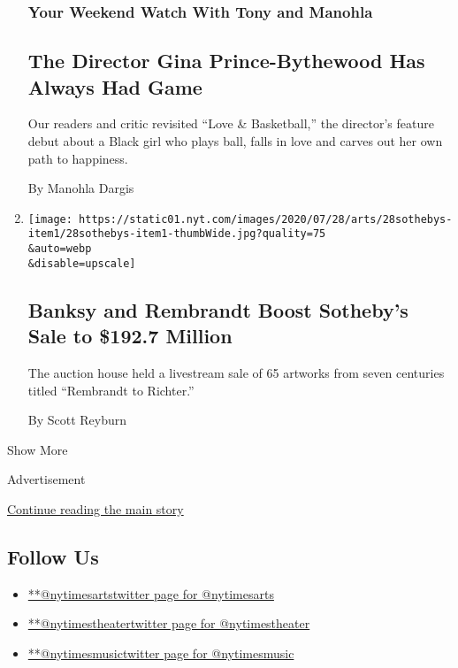 \begin{enumerate}
  \hypertarget{your-weekend-watch-with-tony-and-manohla}{%
  \subsubsection{Your Weekend Watch With Tony and
  Manohla}\label{your-weekend-watch-with-tony-and-manohla}}

  \hypertarget{the-director-gina-prince-bythewood-has-always-had-game}{%
  \subsection{The Director Gina Prince-Bythewood Has Always Had
  Game}\label{the-director-gina-prince-bythewood-has-always-had-game}}

  Our readers and critic revisited ``Love \& Basketball,'' the
  director's feature debut about a Black girl who plays ball, falls in
  love and carves out her own path to happiness.

  By Manohla Dargis
\item
  \href{/2020/07/28/arts/design/sothebys-banksy-rembrandt.html}{}

  \texttt{[image: https://static01.nyt.com/images/2020/07/28/arts/28sothebys-item1/28sothebys-item1-thumbWide.jpg?quality=75\\\&auto=webp\\\&disable=upscale]}

  \hypertarget{banksy-and-rembrandt-boost-sothebys-sale-to-1927-million}{%
  \subsection{Banksy and Rembrandt Boost Sotheby's Sale to \$192.7
  Million}\label{banksy-and-rembrandt-boost-sothebys-sale-to-1927-million}}

  The auction house held a livestream sale of 65 artworks from seven
  centuries titled ``Rembrandt to Richter.''

  By Scott Reyburn
\end{enumerate}

Show More

Advertisement

\protect\hyperlink{after-mid2}{Continue reading the main story}

\hypertarget{follow-us}{%
\subsection{Follow Us}\label{follow-us}}

\begin{itemize}
\tightlist
\item
  \href{https://twitter.com/nytimesarts}{**@nytimesartstwitter page for
  @nytimesarts}
\item
  \href{https://twitter.com/nytimestheater}{**@nytimestheatertwitter
  page for @nytimestheater}
\item
  \href{https://twitter.com/nytimesmusic}{**@nytimesmusictwitter page
  for @nytimesmusic}
\end{itemize}

